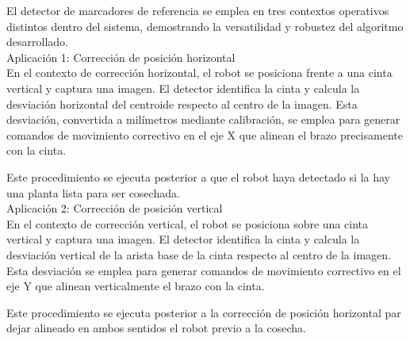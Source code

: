 El detector de marcadores de referencia se emplea en tres contextos operativos distintos dentro del sistema, demostrando la versatilidad y robustez del algoritmo desarrollado.\\

Aplicación 1: Corrección de posición horizontal\\
\noindent
En el contexto de corrección horizontal, el robot se posiciona frente a una cinta vertical y captura una imagen. El detector identifica la cinta y calcula la desviación horizontal del centroide respecto al centro de la imagen. Esta desviación, convertida a milímetros mediante calibración, se emplea para generar comandos de movimiento correctivo en el eje X que alinean el brazo precisamente con la cinta.

Este procedimiento se ejecuta posterior a que el robot haya detectado si la hay una planta lista para ser cosechada.\\

Aplicación 2: Corrección de posición vertical\\
\noindent
En el contexto de corrección vertical, el robot se posiciona sobre una cinta vertical y captura una imagen. El detector identifica la cinta y calcula la desviación vertical de la arista base de la cinta respecto al centro de la imagen. Esta desviación se emplea para generar comandos de movimiento correctivo en el eje Y que alinean verticalmente el brazo con la cinta.

Este procedimiento se ejecuta posterior a la corrección de posición horizontal par dejar alineado en ambos sentidos el robot previo a la cosecha.

